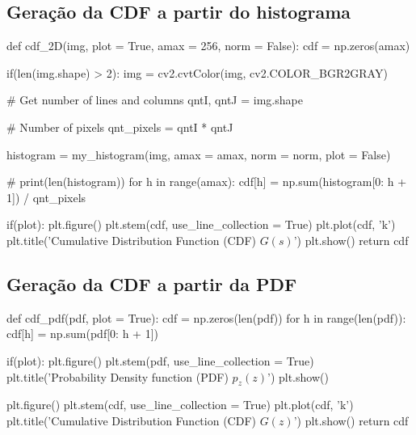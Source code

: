 \documentclass{article}
\begin{document}
\subsection{Geração da CDF a partir do histograma}
\label{cod:cdf_2d}
\begin{python}
def cdf_2D(img, plot = True, amax = 256, norm = False):
	cdf = np.zeros(amax)

	if(len(img.shape) > 2):
		img = cv2.cvtColor(img, cv2.COLOR_BGR2GRAY)
	
	# Get number of lines and columns
	qntI, qntJ = img.shape
	
	# Number of pixels
	qnt_pixels = qntI * qntJ
	
	histogram = my_histogram(img, amax = amax, norm = norm, plot = False)
	
	# print(len(histogram))
	for h in range(amax):
		cdf[h] = np.sum(histogram[0: h + 1]) / qnt_pixels 
	
	if(plot):
		plt.figure()
		plt.stem(cdf, use_line_collection = True)
		plt.plot(cdf, 'k')
		plt.title('Cumulative Distribution Function (CDF) $G(s)$')
		plt.show()
	return cdf
\end{python}

\newpage

\subsection{Geração da CDF a partir da PDF}
\label{cod:cdf_pdf}
\begin{python}
def cdf_pdf(pdf, plot = True):
	cdf = np.zeros(len(pdf))
	for h in range(len(pdf)):
		cdf[h] = np.sum(pdf[0: h + 1])
		
	if(plot):
		plt.figure()
		plt.stem(pdf, use_line_collection = True)
		plt.title('Probability Density function (PDF) $p_z(z)$')
		plt.show()
		
		plt.figure()
		plt.stem(cdf, use_line_collection = True)
		plt.plot(cdf, 'k')
		plt.title('Cumulative Distribution Function (CDF) $G(z)$')
		plt.show()
	return cdf	

\end{python}

\newpage
\end{document}

